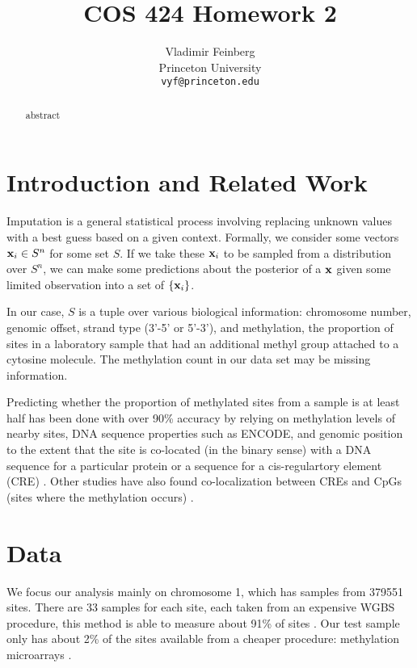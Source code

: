 \documentclass{article} %
\title{COS 424 Homework 2}
\author{
Vladimir Feinberg\\
Princeton University\\
\texttt{vyf@princeton.edu}
}
\begin{document}
\maketitle

\begin{abstract}
abstract
\end{abstract}

\section{Introduction and Related Work}

Imputation is a general statistical process involving replacing unknown values with a best guess based on a given context. Formally, we consider some vectors $\textbf{x}_i\in S^n$ for some set $S$. If we take these $\textbf{x}_i$ to be sampled from a distribution over $S^n$, we can make some predictions about the posterior of a $\textbf{x}$ given some limited observation into a set of $\{\textbf{x}_i\}$.

In our case, $S$ is a tuple over various biological information: chromosome number, genomic offset, strand type (3'-5' or 5'-3'), and methylation, the proportion of sites in a laboratory sample that had an additional methyl group attached to a cytosine molecule. The methylation count in our data set may be missing information.

Predicting whether the proportion of methylated sites from a sample is at least half has been done with over 90\% accuracy by relying on methylation levels of nearby sites, DNA sequence properties such as ENCODE, and genomic position to the extent that the site is co-located (in the binary sense) with a DNA sequence for a particular protein or a sequence for a cis-regulartory element (CRE) \cite{zhang2015predicting}. Other studies have also found co-localization between CREs and CpGs (sites where the methylation occurs) \cite{ziller2013charting}.

\section{Data}

We focus our analysis mainly on chromosome 1, which has samples from 379551 sites. There are 33 samples for each site, each taken from an expensive WGBS procedure, this method is able to measure about 91\% of sites \cite{laird2010principles}. Our test sample only has about 2\% of the sites available from a cheaper procedure: methylation microarrays \cite{zhang2015predicting}.
\end{document}
